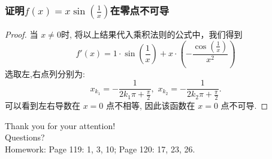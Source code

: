 \documentclass[
10pt,
aspectratio=43,
]{beamer}
\begin{document}
\begin{frame}
	\frametitle{证明$f(x)=x\sin\left(\frac{1}{x}\right)$在零点不可导}

	\begin{proof}
		当 $x\neq0$时, 将以上结果代入乘积法则的公式中，我们得到
		\[
			f'(x) = 1 \cdot \sin\left(\frac{1}{x}\right) + x \cdot \left(-\frac{\cos\left(\frac{1}{x}\right)}{x^2}\right)
		\]
		选取左,右点列分别为:
		\[
			x_{k_1}=-\displaystyle\frac{1}{2k_1\pi+\frac{\pi}{2}},\,\,x_{k_2}=-\displaystyle\frac{1}{2k_2\pi+\frac{\pi}{2}}.
		\]
		可以看到左右导数在 $x=0$ 点不相等, 因此该函数在 $x=0$ 点不可导.
	\end{proof}
\end{frame}




\begin{frame}[plain]
	\vfill
	\centering
	{
		\centering \Huge \color{white} Thank you for your attention!\\[10pt]Questions?\\\bigskip
		Homework: Page 119: 1, 3, 10; Page 120: 17, 23, 26.
	}
	\vfill
\end{frame}
\end{document}
